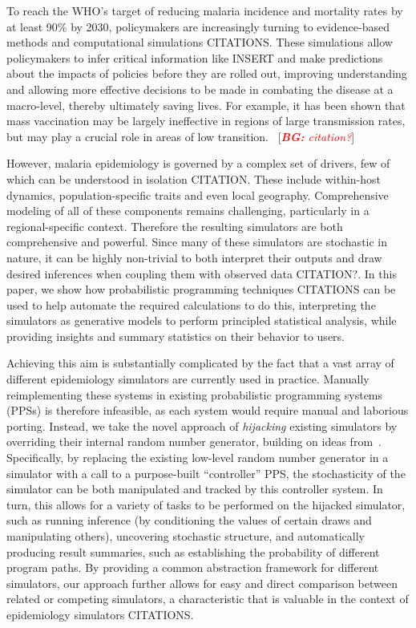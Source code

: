 \documentclass{article}
\newcommand{\bg}[1]{~{{[{\it \textcolor{red}{{\bf BG:} #1}}]}}}
\begin{document}
To reach the WHO’s target of reducing malaria incidence and mortality rates by at least 90\% by 2030, policymakers are increasingly turning to evidence-based methods and computational simulations CITATIONS. 
These simulations allow policymakers to infer critical information like
INSERT and make predictions about the impacts of policies
before they are rolled out, improving understanding and allowing
more effective decisions to be made in combating the disease at a
macro-level, thereby ultimately saving lives.
For example, it has been shown that mass vaccination may be largely ineffective in regions of large transmission rates, but may play a crucial role in areas of low transition. \bg{citation?}

However, malaria epidemiology is governed by a complex set of drivers, 
few of which can be understood in isolation CITATION.
These include within-host dynamics, population-specific traits and even local geography.
Comprehensive modeling of all of these components remains challenging, particularly in a regional-specific context. Therefore the resulting simulators 
are both comprehensive and powerful.  Since many of these simulators are stochastic in nature, it can
be highly non-trivial to both interpret their outputs and draw desired
inferences when coupling them with observed data CITATION?.
In this paper, we show how probabilistic programming
techniques CITATIONS can be used to help automate the required calculations to do this, interpreting the simulators as 
generative models to perform principled statistical analysis, while
providing insights and summary statistics on their behavior to users.

Achieving this aim is substantially complicated by the fact that
a vast array of different epidemiology simulators are currently 
used in practice.
Manually reimplementing these systems in existing
probabilistic programming systems (PPSs) is therefore infeasible, as each
system would require manual and laborious porting.  Instead, we 
take the novel approach of \emph{hijacking} existing simulators by
overriding their internal random number generator, building
on ideas from~\citep{baydin2018efficient}.  Specifically, by
replacing the existing low-level random number generator in a simulator
with a call to a purpose-built ``controller'' PPS, the stochasticity
of the simulator can be both manipulated and tracked by this controller
system.  In turn, this allows for a variety of tasks to be performed on
the hijacked simulator, such as running inference (by conditioning
the values of certain draws and manipulating others),
uncovering stochastic structure, and automatically
producing result summaries, such as establishing the probability
of different program paths.  By providing a common abstraction 
framework for different simulators, our approach further allows for
easy and direct comparison between related or competing
simulators, a characteristic that is valuable in the context of
epidemiology simulators CITATIONS.
\end{document}
